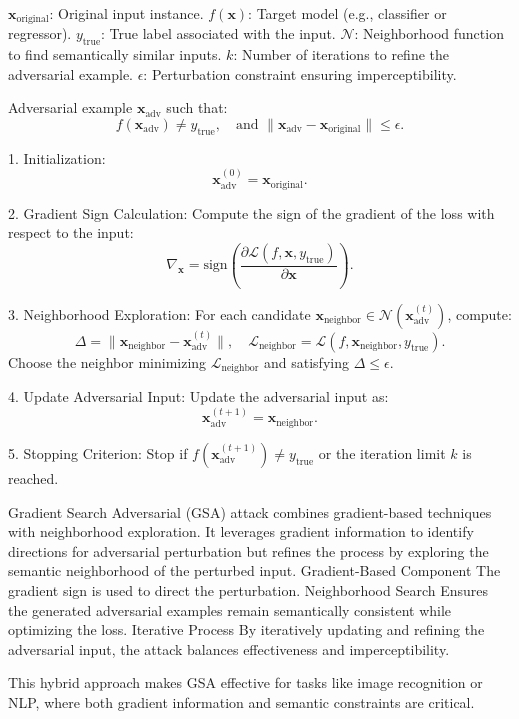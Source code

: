 $\mathbf{x}_{\text{original}}$: Original input instance.  
$f(\mathbf{x})$: Target model (e.g., classifier or regressor).  
$y_{\text{true}}$: True label associated with the input.  
$\mathcal{N}$: Neighborhood function to find semantically similar inputs.  
$k$: Number of iterations to refine the adversarial example.  
$\epsilon$: Perturbation constraint ensuring imperceptibility.

Adversarial example $\mathbf{x}_{\text{adv}}$ such that:  
\[ 
f(\mathbf{x}_{\text{adv}}) \neq y_{\text{true}}, \quad \text{and } \|\mathbf{x}_{\text{adv}} - \mathbf{x}_{\text{original}}\| \leq \epsilon.
\]

1. Initialization:  
   \[
   \mathbf{x}_{\text{adv}}^{(0)} = \mathbf{x}_{\text{original}}.
   \]

2. Gradient Sign Calculation:  
   Compute the sign of the gradient of the loss with respect to the input:  
   \[
   \nabla_{\mathbf{x}} = \text{sign}\left(\frac{\partial \mathcal{L}(f, \mathbf{x}, y_{\text{true}})}{\partial \mathbf{x}}\right).
   \]

3. Neighborhood Exploration:  
   For each candidate $\mathbf{x}_{\text{neighbor}} \in \mathcal{N}(\mathbf{x}_{\text{adv}}^{(t)})$, compute:  
   \[
   \Delta = \|\mathbf{x}_{\text{neighbor}} - \mathbf{x}_{\text{adv}}^{(t)}\|, \quad \mathcal{L}_{\text{neighbor}} = \mathcal{L}(f, \mathbf{x}_{\text{neighbor}}, y_{\text{true}}).
   \]
Choose the neighbor minimizing $\mathcal{L}_{\text{neighbor}}$ and satisfying $\Delta \leq \epsilon$.

4. Update Adversarial Input:  
   Update the adversarial input as:  
   \[
   \mathbf{x}_{\text{adv}}^{(t+1)} = \mathbf{x}_{\text{neighbor}}.
   \]

5. Stopping Criterion:  
   Stop if $f(\mathbf{x}_{\text{adv}}^{(t+1)}) \neq y_{\text{true}}$ or the iteration limit $k$ is reached.

Gradient Search Adversarial (GSA) attack combines gradient-based techniques with neighborhood exploration. It leverages gradient information to identify directions for adversarial perturbation but refines the process by exploring the semantic neighborhood of the perturbed input.  
Gradient-Based Component The gradient sign is used to direct the perturbation.  
Neighborhood Search Ensures the generated adversarial examples remain semantically consistent while optimizing the loss.  
Iterative Process By iteratively updating and refining the adversarial input, the attack balances effectiveness and imperceptibility.  

This hybrid approach makes GSA effective for tasks like image recognition or NLP, where both gradient information and semantic constraints are critical.
